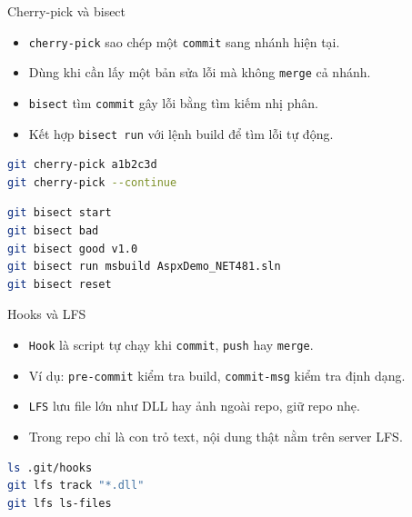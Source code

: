 \begin{frame}[fragile]{Cherry-pick và bisect}
\begin{itemize}
\item \texttt{cherry-pick} sao chép một \texttt{commit} sang nhánh hiện tại.
\item Dùng khi cần lấy một bản sửa lỗi mà không \texttt{merge} cả nhánh.
\item \texttt{bisect} tìm \texttt{commit} gây lỗi bằng tìm kiếm nhị phân.
\item Kết hợp \texttt{bisect run} với lệnh build để tìm lỗi tự động.
\end{itemize}
\begin{lstlisting}[language=bash]
git cherry-pick a1b2c3d
git cherry-pick --continue
\end{lstlisting}
\begin{lstlisting}[language=bash]
git bisect start
git bisect bad
git bisect good v1.0
git bisect run msbuild AspxDemo_NET481.sln
git bisect reset
\end{lstlisting}
\end{frame}

\begin{frame}[fragile]{Hooks và LFS}
\begin{itemize}
\item \texttt{Hook} là script tự chạy khi \texttt{commit}, \texttt{push} hay \texttt{merge}.
\item Ví dụ: \texttt{pre-commit} kiểm tra build, \texttt{commit-msg} kiểm tra định dạng.
\item \texttt{LFS} lưu file lớn như DLL hay ảnh ngoài repo, giữ repo nhẹ.
\item Trong repo chỉ là con trỏ text, nội dung thật nằm trên server LFS.
\end{itemize}
\begin{lstlisting}[language=bash]
ls .git/hooks
git lfs track "*.dll"
git lfs ls-files
\end{lstlisting}
\end{frame}


